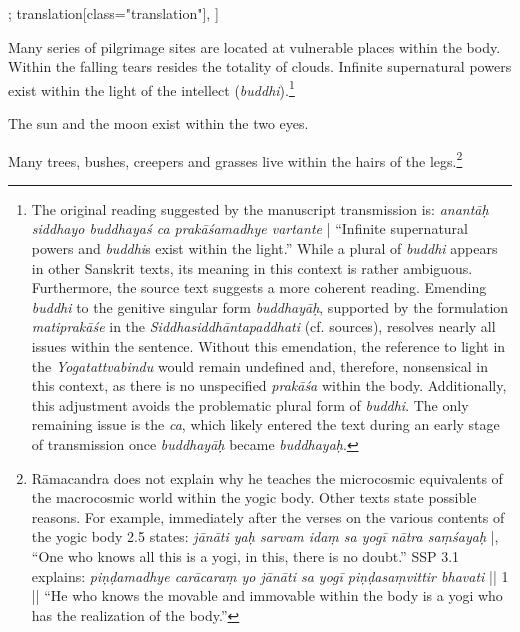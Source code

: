 \begin{alignment}[
  texts=edition[class="edition"];
  translation[class="translation"],
  ]
\begin{translation}
\begin{tlate}[p41_02]
Many series of pilgrimage sites are located at vulnerable places within the body. Within the falling tears resides the totality of clouds. Infinite supernatural powers exist within the light of the intellect (\textit{buddhi}).\footnote{The original reading suggested by the manuscript transmission is: \textit{anantāḥ siddhayo buddhayaś ca prakāśamadhye vartante} | ``Infinite supernatural powers and \textit{buddhi}s exist within the light.'' While a plural of \textit{buddhi} appears in other Sanskrit texts, its meaning in this context is rather ambiguous. Furthermore, the source text suggests a more coherent reading. Emending \textit{buddhi} to the genitive singular form \textit{buddhayāḥ}, supported by the formulation \textit{matiprakāśe} in the \emph{Siddhasiddhāntapaddhati} (cf. sources), resolves nearly all issues within the sentence. Without this emendation, the reference to light in the \emph{Yogatattvabindu} would remain undefined and, therefore, nonsensical in this context, as there is no unspecified \textit{prakāśa} within the body. Additionally, this adjustment avoids the problematic plural form of \textit{buddhi}. The only remaining issue is the \textit{ca}, which likely entered the text during an early stage of transmission once \textit{buddhayāḥ} became \textit{buddhayaḥ}.}

The sun and the moon exist within the two eyes.

Many trees, bushes, creepers and grasses live within the hairs of the legs.\footnote{Rāmacandra does not explain why he teaches the microcosmic equivalents of the macrocosmic world within the yogic body. Other texts state possible reasons. For example, immediately after the verses on the various contents of the yogic body  2.5 states: \textit{jānāti yaḥ sarvam idaṃ sa yogī nātra saṃśayaḥ} |, ``One who knows all this is a yogi, in this, there is no doubt.'' SSP 3.1 explains: \textit{piṇḍamadhye carācaraṃ yo jānāti sa yogī piṇḍasaṃvittir bhavati} || 1 || ``He who knows the movable and immovable within the body is a yogi who has the realization of the body.''}
\flushpage
    \end{tlate}
  \end{translation}
\end{alignment}
\pagebreak %

